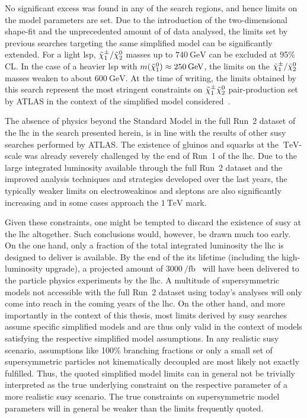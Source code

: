 No significant excess was found in any of the search regions, and hence limits on the model parameters are set. Due to the introduction of the two-dimensional shape-fit and the unprecedented amount of \onethirtynineifb of data analysed, the limits set by previous searches targeting the same simplified model can be significantly extended. For a light \gls{lsp}, $\tilde{\chi}_1^\pm/\tilde{\chi}_2^0$ masses up to $\SI{740}{\GeV}$ can be excluded at 95\% CL. In the case of a heavier \gls{lsp} with $m(\lsp)\approx\SI{250}{\GeV}$, the limits on the $\tilde{\chi}_1^\pm/\tilde{\chi}_2^0$ masses weaken to about $\SI{600}{\GeV}$. At the time of writing, the limits obtained by this search represent the most stringent constraints on $\tilde{\chi}_1^\pm\tilde{\chi}_2^0$ pair-production set by ATLAS in the context of the simplified model considered~\cite{ATL-PHYS-PUB-2020-020}.

The absence of physics beyond the Standard Model in the full Run~2 dataset of the \gls{lhc} in the search presented herein, is in line with the results of other \gls{susy} searches performed by ATLAS. The existence of gluinos and squarks at the $\SI{}{\TeV}$-scale was already severely challenged by the end of Run~1 of the \gls{lhc}. Due to the large integrated luminosity available through the full Run~2 dataset and the improved analysis techniques and strategies developed over the last years, the typically weaker limits on electroweakinos and sleptons are also significantly increasing and in some cases approach the $\SI{1}{\TeV}$ mark. 

Given these constraints, one might be tempted to discard the existence of \gls{susy} at the \gls{lhc} altogether. Such conclusions would, however, be drawn much too early. On the one hand, only a fraction of the total integrated luminosity the \gls{lhc} is designed to deliver is available. By the end of the its lifetime (including the high-luminosity upgrade), a projected amount of $\SI{3000}{\per\femto\barn}$~\cite{Apollinari:2116337} will have been delivered to the particle physics experiments by the \gls{lhc}. A multitude of supersymmetric models not accessible with the full Run~2 dataset using today's analyses will only come into reach in the coming years of the \gls{lhc}.
On the other hand, and more importantly in the context of this thesis, most limits derived by \gls{susy} searches assume specific simplified models and are thus only valid in the context of models satisfying the respective simplified model assumptions. In any realistic \gls{susy} scenario, assumptions like 100\% branching fractions or only a small set of supersymmetric particles not kinematically decoupled are most likely not exactly fulfilled. Thus, the quoted simplified model limits can in general not be trivially interpreted as the true underlying constraint on the respective parameter of a more realistic \gls{susy} scenario. The true constraints on supersymmetric model parameters will in general be weaker than the limits frequently quoted.
 

